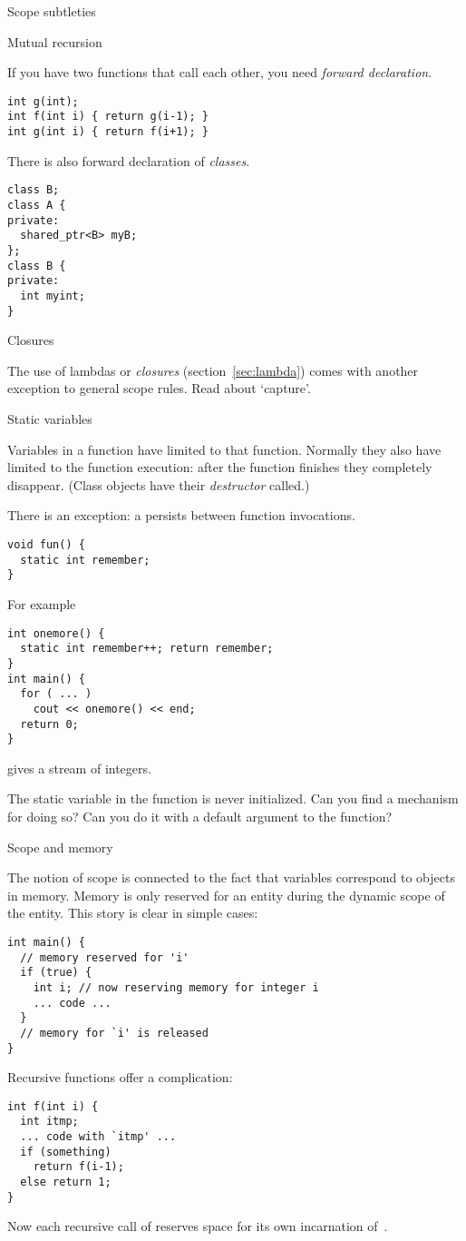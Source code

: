  {Scope subtleties}

 {Mutual recursion}

If you have two functions  that call each other, you need
%
\emph{forward declaration}.
%
\begin{verbatim}
int g(int);
int f(int i) { return g(i-1); }
int g(int i) { return f(i+1); }
\end{verbatim}

There is also forward declaration of
%
\emph{classes}.
\begin{verbatim}
class B;
class A {
private:
  shared_ptr<B> myB;
};
class B {
private:
  int myint;
}
\end{verbatim}

 {Closures}

The use of 
%
lambdas
or
%
\emph{closures} (section~\ref{sec:lambda}) comes with
another exception to general scope rules. Read about `capture'.

 {Static variables}
\label{sec:static-scope}

Variables in a function have  limited to
that function. Normally they also have 
limited to the function execution: after the function finishes they
completely disappear. (Class objects have their
%
\emph{destructor}
called.)

There is an exception: a  persists
between function invocations.
\begin{verbatim}
void fun() {
  static int remember;
}
\end{verbatim}
For example
\begin{verbatim}
int onemore() {
  static int remember++; return remember;
}
int main() {
  for ( ... )
    cout << onemore() << end;
  return 0;
}
\end{verbatim}
gives a stream of integers.
\begin{exercise}
  The static variable in the  function is never
  initialized. Can you find a mechanism for doing so?
  Can you do it with a default argument to the function?
\end{exercise}

 {Scope and memory}

The notion of scope is connected to the fact that variables correspond
to objects in memory. Memory is only reserved for an entity during the
dynamic scope of the entity. This story is clear in simple cases:
\begin{verbatim}
int main() {
  // memory reserved for 'i'
  if (true) {
    int i; // now reserving memory for integer i
    ... code ...
  }
  // memory for `i' is released
}
\end{verbatim}
Recursive functions offer a complication:
\begin{verbatim}
int f(int i) {
  int itmp;
  ... code with `itmp' ...
  if (something)
    return f(i-1);
  else return 1;
}
\end{verbatim}
Now each recursive call of  reserves space for its own
incarnation of~.

